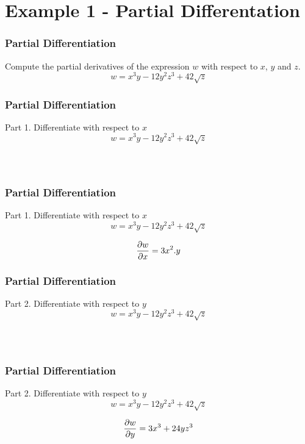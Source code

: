 \documentclass{beamer}
\begin{document}
\begin{frame}
\tableofcontents
\end{frame}
\section{Example 1 - Partial Differentation}
\begin{frame}
\frametitle{Partial Differentiation}
\Large
\vspace{-1cm}
Compute the partial derivatives of the expression $w$ with respect to $x$, $y$ and $z$.
\LARGE
\[ w = x^3y -12y^2z^3 + 42 \sqrt{z} \]

\end{frame}
\begin{frame}
\frametitle{Partial Differentiation}
\Large
\vspace{-2cm}
Part 1. Differentiate with respect to $x$
\[ w = x^3y -12y^2z^3 + 42 \sqrt{z} \]

\LARGE
\[ \phantom{{\partial w \over \partial x } =3x^2.y} \]


\end{frame}
\begin{frame}
\frametitle{Partial Differentiation}
\Large
\vspace{-2cm}
Part 1. Differentiate with respect to $x$
\[ w = x^3y -12y^2z^3 + 42 \sqrt{z} \]

\LARGE
\[ {\partial w \over \partial x } =3x^2.y \]


\end{frame}

\begin{frame}
\frametitle{Partial Differentiation}
\Large
\vspace{-2cm}
Part 2. Differentiate with respect to $y$
\[ w = x^3y -12y^2z^3 + 42 \sqrt{z} \]

\LARGE
\[ \phantom{{\partial w \over \partial y } =3x^3 + 24yz^3} \]
\end{frame}
\begin{frame}
\frametitle{Partial Differentiation}
\Large
\vspace{-2cm}
Part 2. Differentiate with respect to $y$
\[ w = x^3y -12y^2z^3 + 42 \sqrt{z} \]

\LARGE
\[ {\partial w \over \partial y } =3x^3 + 24yz^3 \]
\end{frame}
\end{document}
